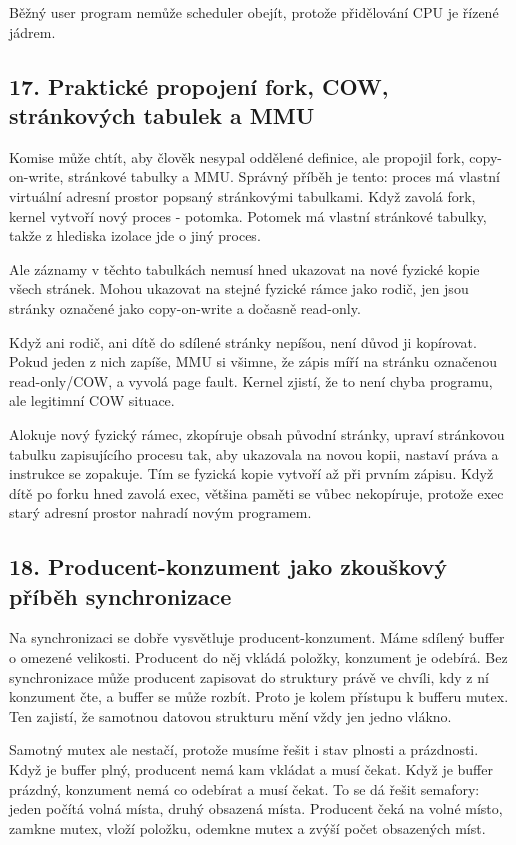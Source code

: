 Běžný user program nemůže scheduler obejít, protože přidělování CPU je řízené jádrem.

\subsection*{17. Praktické propojení fork, COW, stránkových tabulek a MMU}

Komise může chtít, aby člověk nesypal oddělené definice, ale propojil fork, copy-on-write, stránkové tabulky a MMU. Správný příběh je tento: proces má vlastní virtuální adresní prostor popsaný stránkovými tabulkami. Když zavolá fork, kernel vytvoří nový proces - potomka. Potomek má vlastní stránkové tabulky, takže z hlediska izolace jde o jiný proces.

Ale záznamy v těchto tabulkách nemusí hned ukazovat na nové fyzické kopie všech stránek. Mohou ukazovat na stejné fyzické rámce jako rodič, jen jsou stránky označené jako copy-on-write a dočasně read-only.

Když ani rodič, ani dítě do sdílené stránky nepíšou, není důvod ji kopírovat. Pokud jeden z nich zapíše, MMU si všimne, že zápis míří na stránku označenou read-only/COW, a vyvolá page fault. Kernel zjistí, že to není chyba programu, ale legitimní COW situace.

Alokuje nový fyzický rámec, zkopíruje obsah původní stránky, upraví stránkovou tabulku zapisujícího procesu tak, aby ukazovala na novou kopii, nastaví práva a instrukce se zopakuje. Tím se fyzická kopie vytvoří až při prvním zápisu. Když dítě po forku hned zavolá exec, většina paměti se vůbec nekopíruje, protože exec starý adresní prostor nahradí novým programem.

\subsection*{18. Producent-konzument jako zkouškový příběh synchronizace}

Na synchronizaci se dobře vysvětluje producent-konzument. Máme sdílený buffer o omezené velikosti. Producent do něj vkládá položky, konzument je odebírá. Bez synchronizace může producent zapisovat do struktury právě ve chvíli, kdy z ní konzument čte, a buffer se může rozbít. Proto je kolem přístupu k bufferu mutex. Ten zajistí, že samotnou datovou strukturu mění vždy jen jedno vlákno.

Samotný mutex ale nestačí, protože musíme řešit i stav plnosti a prázdnosti. Když je buffer plný, producent nemá kam vkládat a musí čekat. Když je buffer prázdný, konzument nemá co odebírat a musí čekat. To se dá řešit semafory: jeden počítá volná místa, druhý obsazená místa. Producent čeká na volné místo, zamkne mutex, vloží položku, odemkne mutex a zvýší počet obsazených míst.

